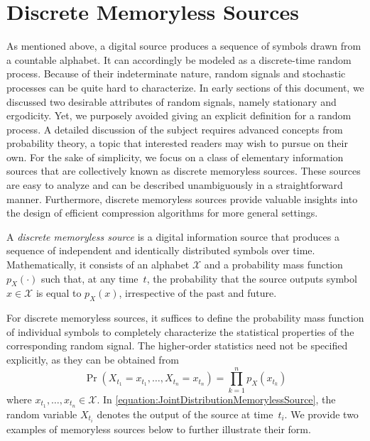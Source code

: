 \section{Discrete Memoryless Sources}

As mentioned above, a digital source produces a sequence of symbols drawn from a countable alphabet.
It can accordingly be modeled as a discrete-time random process.
Because of their indeterminate nature, random signals and stochastic processes can be quite hard to characterize.
In early sections of this document, we discussed two desirable attributes of random signals, namely stationary and ergodicity.
Yet, we purposely avoided giving an explicit definition for a random process.
A detailed discussion of the subject requires advanced concepts from probability theory, a topic that interested readers may wish to pursue on their own.
For the sake of simplicity, we focus on a class of elementary information sources that are collectively known as discrete memoryless sources.
These sources are easy to analyze and can be described unambiguously in a straightforward manner.
Furthermore, discrete memoryless sources provide valuable insights into the design of efficient compression algorithms for more general settings.

\begin{definition}
A \emph{discrete memoryless source} is a digital information source that produces a sequence of independent and identically distributed symbols over time.
Mathematically, it consists of an alphabet $\mathcal{X}$ and a probability mass function $p_X(\cdot)$ such that, at any time~$t$, the probability that the source outputs symbol $x \in \mathcal{X}$ is equal to $p_X(x)$, irrespective of the past and future.
\end{definition}

For discrete memoryless sources, it suffices to define the probability mass function of individual symbols to completely characterize the statistical properties of the corresponding random signal.
The higher-order statistics need not be specified explicitly, as they can be obtained from
\begin{equation} \label{equation:JointDistributionMemorylessSource}
\Pr (X_{t_1} = x_{t_1}, \ldots, X_{t_n} = x_{t_n})
= \prod_{k = 1}^n p_X(x_{t_k})
\end{equation}
where $x_{t_1}, \ldots, x_{t_n} \in \mathcal{X}$.
In \eqref{equation:JointDistributionMemorylessSource}, the random variable $X_{t_i}$ denotes the output of the source at time~$t_i$.
We provide two examples of memoryless sources below to further illustrate their form.

